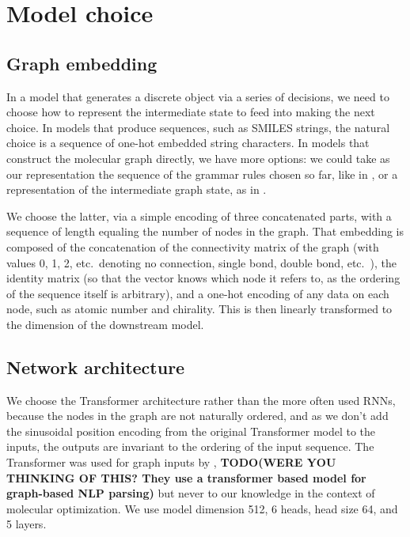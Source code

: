 \documentclass{article}
\newcommand{\TODO}[1]{{\bf TODO(#1)}}
\begin{document}


\section{Model choice}\label{sec:model}
\subsection{Graph embedding}
In a model that generates a discrete object via a series of decisions, we need to choose how to represent the intermediate state to feed into making the next choice. In models that produce sequences, such as SMILES strings, the natural choice is a sequence of one-hot embedded string characters. In models that construct the molecular graph directly, we have more options: we could take as our representation the sequence of the grammar rules chosen so far, like in \cite{kusner2017, kraev2018}, or a representation of the intermediate graph state, as in \cite{you2018}.

We choose the latter, via a simple encoding of three concatenated parts, with a sequence of length equaling the number of nodes in the graph. That embedding is composed of the concatenation of the connectivity matrix of the graph (with values 0, 1, 2, etc.~denoting no connection, single bond, double bond, etc.~), the identity matrix (so that the vector knows which node it refers to, as the ordering of the sequence itself is arbitrary), and a one-hot encoding of any data on each node, such as atomic number and chirality. This is then linearly transformed to the dimension of the downstream model.

\subsection{Network architecture}
We choose the Transformer architecture \cite{vaswani2017} rather than the more often used RNNs, because the nodes in the graph are not naturally ordered, and as we don't add the sinusoidal position encoding from the original Transformer model to the inputs, the outputs are invariant to the ordering of the input sequence. The Transformer was used for graph inputs by \cite{kondratyuk2019}, \TODO{WERE YOU THINKING OF THIS? They use a transformer based model for graph-based NLP parsing} but never to our knowledge in the context of molecular optimization. We use model dimension 512, 6 heads, head size 64, and 5 layers.
\end{document}
